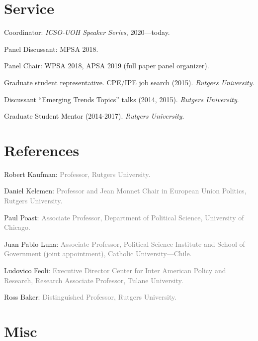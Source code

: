 \documentclass[letterpaper]{article}
\renewenvironment{itemize}{
  \begin{list}{}{
    \setlength{\leftmargin}{1.5em}
  }
}{
  \end{list}
}
\begin{document}


\section*{Service}

\begin{itemize}
\item[\textcolor{gray}{\textbullet}] Coordinator: \emph{ICSO-UOH Speaker Series}, 2020---today.
\item[\textcolor{gray}{\textbullet}] Panel Discussant: MPSA 2018.
\item[\textcolor{gray}{\textbullet}] Panel Chair: WPSA 2018, APSA 2019 (full paper panel organizer).
\item[\textcolor{gray}{\textbullet}] Graduate student representative. CPE/IPE job search (2015). \emph{Rutgers University}.
\item[\textcolor{gray}{\textbullet}] Discussant ``Emerging Trends Topics'' talks (2014, 2015). \emph{Rutgers University}.
\item[\textcolor{gray}{\textbullet}] Graduate Student Mentor (2014-2017). \emph{Rutgers University}.
\end{itemize}




\section*{References}
\begin{itemize}
\item[\textcolor{gray}{\textbullet}] Robert Kaufman: {\textcolor{gray}{\scriptsize Professor, Rutgers University.}}
\item[\textcolor{gray}{\textbullet}] Daniel Kelemen: {\textcolor{gray}{\scriptsize Professor and Jean Monnet Chair in European Union Politics, Rutgers University.}}
\item[\textcolor{gray}{\textbullet}] Paul Poast: {\textcolor{gray}{\scriptsize Associate Professor, Department of Political Science, University of Chicago.}}
\item[\textcolor{gray}{\textbullet}] Juan Pablo Luna: {\textcolor{gray}{\scriptsize Associate Professor, Political Science Institute and School of Government (joint appointment), Catholic University---Chile.}}
\item[\textcolor{gray}{\textbullet}] Ludovico Feoli: {\textcolor{gray}{\scriptsize Executive Director Center for Inter American Policy and Research, Research Associate Professor, Tulane University.}}
\item[\textcolor{gray}{\textbullet}] Ross Baker: {\textcolor{gray}{\scriptsize Distinguished Professor, Rutgers University.}}
\end{itemize}




\section*{Misc}
{\unskip}




\bigskip
\end{document}
